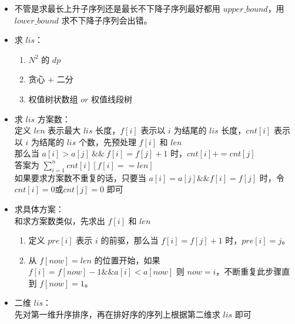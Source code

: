 \documentclass[E:/GsjzTle/main/main.tex]{subfiles}
\begin{document}
	
	\begin{itemize}
		\item
		不管是求最长上升子序列还是最长不下降子序列最好都用
		\(upper\_bound\)，用 \(lower\_bound\) 求不下降子序列会出错。
		\item
		求 \(lis\)：
		
		\begin{enumerate}
			\def\labelenumi{\arabic{enumi}.}
			\item
			\(N^2\) 的 \(dp\)
			\item
			贪心 \(+\) 二分
			\item
			权值树状数组 \(or\) 权值线段树
		\end{enumerate}
		\item
		求 \(lis\) 方案数：\\
		定义 \(len\) 表示最大 \(lis\) 长度，\(f[i]\) 表示以 \(i\) 为结尾的
		\(lis\) 长度，\(cnt[i]\) 表示以 \(i\) 为结尾的 \(lis\) 个数，先预处理
		\(f[i]\) 和 \(len\)\\
		那么当 \(a[i] > a[j]~\&\&~f[i] = f[j] + 1\) 时，\(cnt[i] += cnt[j]\)\\
		答案为 \(\sum_{i=1}^{n}cnt[i][f[i] == len]\)\\
		如果要求方案数不重复的话，只要当 \(a[i] = a[j] \&\&f[i]=f[j]\)
		时，令\(cnt[i] = 0\)或\(cnt[j] = 0\) 即可
		\item
		求具体方案：\\
		和求方案数类似，先求出 \(f[i]\) 和 \(len\)
		
		\begin{enumerate}
			\def\labelenumi{\arabic{enumi}.}
			\item
			定义 \(pre[i]\) 表示 \(i\) 的前驱，那么当 \(f[i] = f[j] + 1\)
			时，\(pre[i] = j\)。
			\item
			从 \(f[now] = len\) 的位置开始，如果
			\(f[i] = f[now]-1\&\&a[i] < a[now]\) 则
			\(now = i\)，不断重复此步骤直到 \(f[now] = 1\)。
		\end{enumerate}
		\item
		二维 \(lis\)：\\
		先对第一维升序排序，再在排好序的序列上根据第二维求 \(lis\) 即可
	\end{itemize}
	
\end{document}
